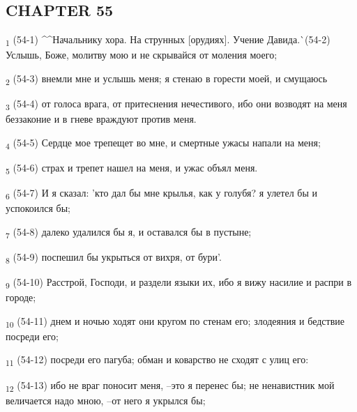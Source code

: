 \subsection{CHAPTER 55}
\begin{tcolorbox}
\textsubscript{1} (54-1) ^^Начальнику хора. На струнных [орудиях]. Учение Давида.^^ (54-2) Услышь, Боже, молитву мою и не скрывайся от моления моего;
\end{tcolorbox}
\begin{tcolorbox}
\textsubscript{2} (54-3) внемли мне и услышь меня; я стенаю в горести моей, и смущаюсь
\end{tcolorbox}
\begin{tcolorbox}
\textsubscript{3} (54-4) от голоса врага, от притеснения нечестивого, ибо они возводят на меня беззаконие и в гневе враждуют против меня.
\end{tcolorbox}
\begin{tcolorbox}
\textsubscript{4} (54-5) Сердце мое трепещет во мне, и смертные ужасы напали на меня;
\end{tcolorbox}
\begin{tcolorbox}
\textsubscript{5} (54-6) страх и трепет нашел на меня, и ужас объял меня.
\end{tcolorbox}
\begin{tcolorbox}
\textsubscript{6} (54-7) И я сказал: 'кто дал бы мне крылья, как у голубя? я улетел бы и успокоился бы;
\end{tcolorbox}
\begin{tcolorbox}
\textsubscript{7} (54-8) далеко удалился бы я, и оставался бы в пустыне;
\end{tcolorbox}
\begin{tcolorbox}
\textsubscript{8} (54-9) поспешил бы укрыться от вихря, от бури'.
\end{tcolorbox}
\begin{tcolorbox}
\textsubscript{9} (54-10) Расстрой, Господи, и раздели языки их, ибо я вижу насилие и распри в городе;
\end{tcolorbox}
\begin{tcolorbox}
\textsubscript{10} (54-11) днем и ночью ходят они кругом по стенам его; злодеяния и бедствие посреди его;
\end{tcolorbox}
\begin{tcolorbox}
\textsubscript{11} (54-12) посреди его пагуба; обман и коварство не сходят с улиц его:
\end{tcolorbox}
\begin{tcolorbox}
\textsubscript{12} (54-13) ибо не враг поносит меня, --это я перенес бы; не ненавистник мой величается надо мною, --от него я укрылся бы;
\end{tcolorbox}
